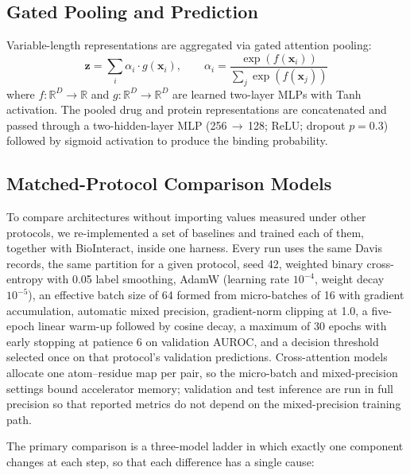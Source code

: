 \documentclass[fleqn,10pt]{wlscirep}
\begin{document}
\subsection{Gated Pooling and Prediction}

Variable-length representations are aggregated via gated attention pooling:
\begin{equation}
\mathbf{z} = \sum_{i}\alpha_i\cdot g(\mathbf{x}_i),\qquad
\alpha_i = \frac{\exp(f(\mathbf{x}_i))}{\sum_j\exp(f(\mathbf{x}_j))}
\end{equation}
where $f\colon\mathbb{R}^D\to\mathbb{R}$ and
$g\colon\mathbb{R}^D\to\mathbb{R}^D$ are learned two-layer MLPs with Tanh
activation.  The pooled drug and protein representations are concatenated and
passed through a two-hidden-layer MLP (256\,$\to$\,128; ReLU; dropout $p=0.3$)
followed by sigmoid activation to produce the binding probability.

\begingroup\color{red}
\subsection{Matched-Protocol Comparison Models}
\label{sec:matched_methods}

To compare architectures without importing values measured under other
protocols, we re-implemented a set of baselines and trained each of them,
together with BioInteract, inside one harness.  Every run uses the same Davis records,
the same partition for a given protocol, seed 42, weighted binary cross-entropy
with 0.05 label smoothing, AdamW (learning rate $10^{-4}$, weight decay
$10^{-5}$), an effective batch size of 64 formed from micro-batches of 16 with
gradient accumulation, automatic mixed precision, gradient-norm clipping at 1.0,
a five-epoch linear warm-up followed by cosine decay, a maximum of 30 epochs
with early stopping at patience 6 on validation AUROC, and a decision threshold
selected once on that protocol's validation predictions.  Cross-attention
models allocate one atom--residue map per pair, so the micro-batch and
mixed-precision settings bound accelerator memory; validation and test
inference are run in full precision so that reported metrics do not depend on
the mixed-precision training path.

The primary comparison is a three-model ladder in which exactly one component
changes at each step, so that each difference has a single cause:
\end{document}
